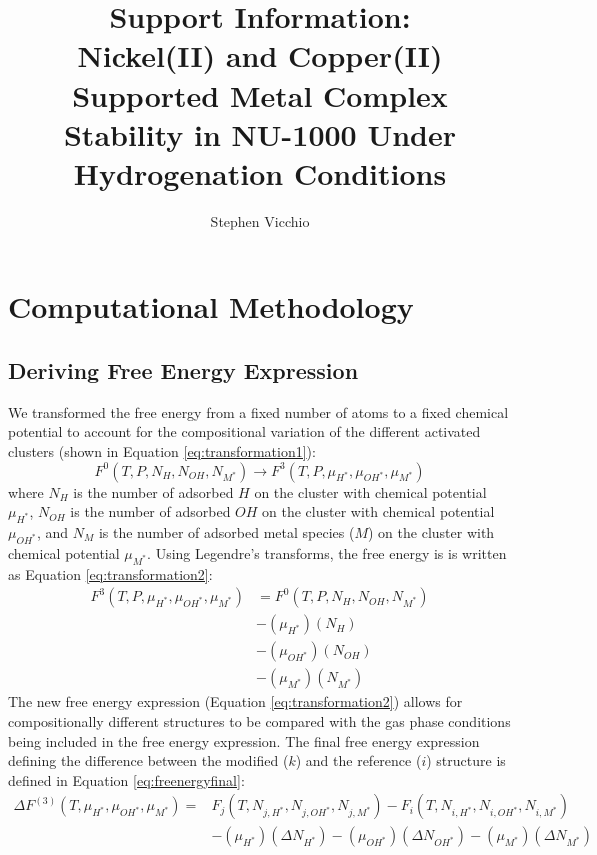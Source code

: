 \documentclass[12pt]{article}
\title{Support Information: \\
Nickel(II) and Copper(II) Supported Metal Complex Stability in NU-1000 Under Hydrogenation Conditions}
\author{Stephen Vicchio}
\begin{document}
\maketitle


\section{Computational Methodology}
\subsection{Deriving Free Energy Expression}
We transformed the free energy from a fixed number of atoms to a fixed chemical potential to account for the compositional variation of the different activated clusters (shown in Equation \ref{eq:transformation1}):
\begin{equation}
    F^{0}(T,P,N_{H},N_{OH},N_{M^{*}}) \rightarrow F^{3}(T,P,\mu_{H^{*}},\mu_{OH^{*}},\mu_{M^{*}})
    \label{eq:transformation1}
\end{equation}
where $N_{H}$ is the number of adsorbed $H$ on the cluster with chemical potential $\mu_{H^{*}}$, $N_{OH}$ is the number of adsorbed $OH$ on the cluster with chemical potential $\mu_{OH^{*}}$, and $N_{M}$ is the number of adsorbed metal species ($M$) on the cluster with chemical potential $\mu_{M^{*}}$. Using Legendre's transforms, the free energy is is written as Equation \ref{eq:transformation2}:
\begin{equation}
    \begin{split}
        F^{3}(T,P,\mu_{H^{*}},\mu_{OH^{*}},\mu_{M^{*}}) &= F^{0}(T,P,N_{H},N_{OH},N_{M^{*}}) \\ &- (\mu_{H^{*}})(N_{H}) \\ &- (\mu_{OH^{*}})(N_{OH}) \\ &- (\mu_{M^{*}})(N_{M^{*}})  
        \label{eq:transformation2}    
    \end{split}
\end{equation}
The new free energy expression (Equation \ref{eq:transformation2}) allows for compositionally different structures to be compared with the gas phase conditions being included in the free energy expression. The final free energy expression defining the difference between the modified ($k$) and the reference ($i$) structure is defined in Equation \ref{eq:freenergyfinal}:
\begin{equation}
    \begin{split}
        \Delta F^{(3)}(T,\mu_{H^{*}},\mu_{OH^{*}},\mu_{M^{*}})  = 
        & F_{j}(T,N_{j,H^{*}},N_{j,OH^{*}},N_{j,M^{*}}) - 
          F_{i}(T,N_{i,H^{*}},N_{i,OH^{*}},N_{i,M^{*}}) \\
        & - (\mu_{H^{*}})(\Delta N_{H^{*}}) - (\mu_{OH^{*}})(\Delta N_{OH^{*}}) - (\mu_{M^{*}})(\Delta N_{M^{*}}) \\ 
    \end{split}
    \label{eq:freenergyfinal}
\end{equation}
\end{document}
